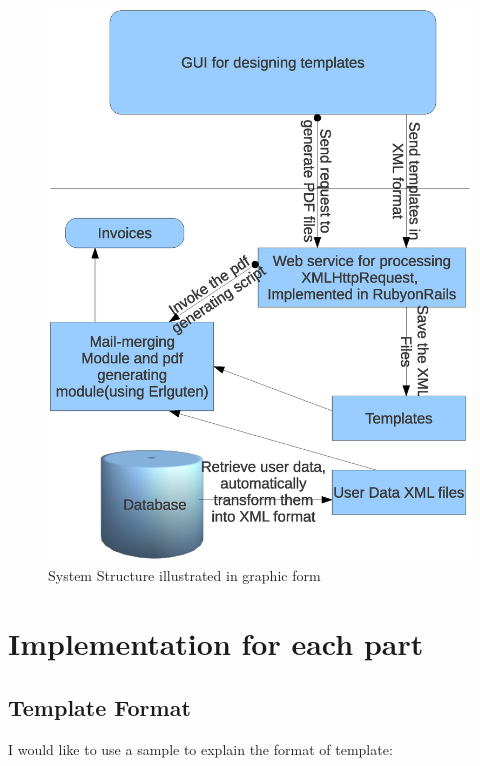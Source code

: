 \documentclass[12pt,twoside,a4paper]{report}
\begin{document}
\begin{figure}[p]
\centering
\includegraphics[scale=0.5]{systemstructure.eps}
\caption{System Structure illustrated in graphic form}
\label{fig1}
\end{figure}

\section{Implementation for each part}
\subsection{Template Format}
  I would like to use a sample to explain the format of template:
\end{document}
